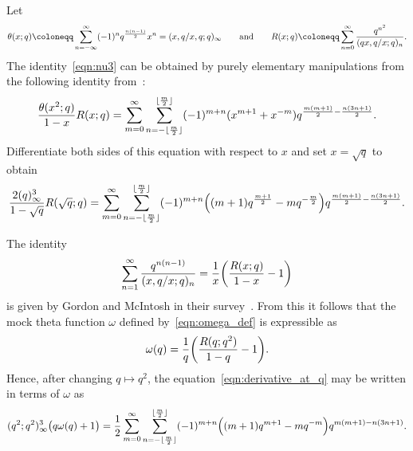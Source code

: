\documentclass[11pt,reqno]{amsart}
\renewcommand{\=}{\;=\;}
\theoremstyle{myremark}
\begin{document}
Let
\[ \theta(x;q) \coloneqq \sum_{n=-\infty}^\infty (-1)^n q^{n(n-1) \over 2} x^n = (x,q/x,q;q)_\infty \qquad \text{and} \qquad R(x;q) \coloneqq\sum_{n=0}^\infty {q^{n^2} \over (qx,q/x;q)_n}. \]
The identity~\eqref{eqn:nu3} can be obtained by purely elementary manipulations from the following identity from~\cite[Equation~2.20]{Garvan2023}:
\[ {\theta(x^2;q) \over 1-x} R(x;q) = \sum_{m=0}^\infty \sum_{n=-\lfloor{m \over 2}\rfloor}^{\lfloor{m \over 2}\rfloor} (-1)^{m+n} (x^{m+1}+x^{-m}) q^{{m(m+1) \over 2} - {n(3n+1) \over 2}}. \]
Differentiate both sides of this equation with respect to $x$ and set $x=\sqrt{q}$ to obtain
\begin{equation} \label{eqn:derivative_at_q}
{2(q)_\infty^3 \over 1-\sqrt{q}} R(\sqrt{q};q) = \sum_{m=0}^\infty \sum_{n=-\lfloor{m \over 2}\rfloor}^{\lfloor{m \over 2}\rfloor} (-1)^{m+n} \Big( (m+1)q^{m+1 \over 2}-mq^{-{m \over 2}}\Big) q^{{m(m+1) \over 2} - {n(3n+1) \over 2}}.
\end{equation}

The identity
\[ \sum_{n=1}^\infty {q^{n(n-1)} \over (x,q/x;q)_n} = {1 \over x}\bigg( {R(x;q) \over 1-x} - 1 \bigg) \]
is given by Gordon and McIntosh in their survey~\cite[Equation~6.4]{Gordon2012}. From this it follows that the mock theta function $\omega$ defined by~\eqref{eqn:omega_def} is expressible as
\[ \omega(q) = {1 \over q} \bigg( {R(q;q^2) \over 1-q} - 1 \bigg). \]
Hence, after changing $q \mapsto q^2$, the equation~\eqref{eqn:derivative_at_q} may be written in terms of $\omega$ as
\begin{equation} \label{eqn:omega_expansion}
(q^2;q^2)_\infty^3 \big( q\omega(q) + 1\big) = {1 \over 2}\sum_{m=0}^\infty \sum_{n=-\lfloor{m \over 2}\rfloor}^{\lfloor{m \over 2}\rfloor} (-1)^{m+n} \Big( (m+1)q^{m+1}-mq^{-m}\Big) q^{m(m+1) - n(3n+1)}.
\end{equation}
\end{document}
